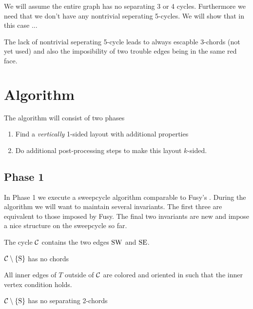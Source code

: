 \renewcommand{\Q}{\scr Q}



We will assume the entire graph has no separating 3 or 4 cycles. Furthermore we need that we don't have any nontrivial seperating 5-cycles.  We will show that in this case ...

The lack of nontrivial seperating 5-cycle leads to always escapble 3-chords (not yet used) and also the imposibility of two trouble edges being in the same red face.


\section{Algorithm}
  The algorithm will consist of two phases

  \begin{enumerate}
    \item Find a \emph{vertically} 1-sided layout with additional properties
    \item Do additional post-processing steps to make this layout $k$-sided.
  \end{enumerate}

\subsection{Phase 1}
  In Phase 1 we execute a sweepcycle algorithm comparable to Fusy's \cite{Fusy2006}.
  During the algorithm we will want to maintain several invariants. The first three are equivalent to those imposed by Fusy. The final two invariants are new and impose a nice structure on the sweepcycle so far.

  \begin{invariants}
    \itemsep=-4pt

    \item \label{i:uni:SWandSE} The cycle $\mathcal{C}$ contains the two edges $\mathrm{S} \mathrm{W}$ and $\mathrm{S} \mathrm{E}$.
    \item \label{i:uni:noChords} $\mathcal{C} \setminus \left\lbrace {\mathrm{S}} \right\rbrace$ has no chords
    \item \label{i:uni:intVertCond} All inner edges of $T$ outside of $\mathcal{C}$ are colored and oriented in such that the inner vertex condition holds. %
    \item \label{i:uni:no2Chords} $\mathcal{C}\setminus \left\lbrace {\mathrm{S}} \right\rbrace$ has no separating 2-chords
  \end{invariants}


